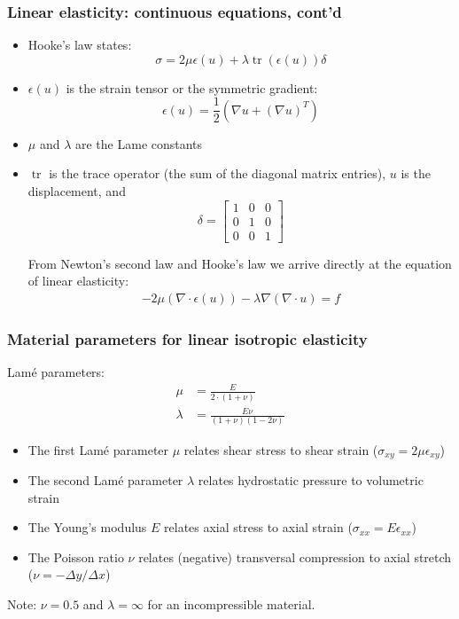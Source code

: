 \begin{frame}
\frametitle{Linear elasticity: continuous equations, cont'd}
\begin{itemize}
\item Hooke's law states:
\[
\sigma = 2 \mu \epsilon(u) + \lambda \operatorname{tr}(\epsilon(u)) \delta
\]
\item $\epsilon(u)$ is the strain tensor or the symmetric gradient:
\[
\epsilon(u) = \frac{1}{2} (\nabla u + (\nabla u)^T)
\]
\item $\mu$ and $\lambda$ are the Lame constants
\item $\operatorname{tr}$ is the trace operator (the sum of the diagonal matrix
entries), $u$ is the displacement, and
\[
\delta = \left[ \begin{array}{ccc} 1 & 0 & 0 \\ 0 & 1 & 0 \\ 0 & 0 & 1 \end{array} \right]
\]

From Newton's second law and Hooke's law we arrive directly at the equation of linear elasticity:
\begin{align}
\label{el:eq}
-2 \mu (\nabla \cdot \epsilon (u)) - \lambda \nabla (\nabla \cdot u) = f
\end{align}
\end{itemize}
\end{frame}

\begin{frame}
\frametitle{Material parameters for linear isotropic elasticity}

Lam\'e parameters:
\begin{align}
\mu &= \frac{E}{2\cdot(1 + \nu)} \\
\lambda &= \frac{E\nu}{(1 + \nu)(1 - 2\nu)}
\end{align}

\begin{itemize}
\item
  The first Lam\'e parameter $\mu$ relates shear stress to shear strain ($\sigma_{xy} = 2\mu\epsilon_{xy}$)
\item
  The second Lam\'e parameter $\lambda$ relates hydrostatic pressure to volumetric strain
\item
  The Young's modulus $E$ relates axial stress to axial strain ($\sigma_{xx} = E\epsilon_{xx}$)
\item
  The Poisson ratio $\nu$ relates (negative) transversal compression to axial stretch ($\nu = -\Delta y / \Delta x$)
\end{itemize}

Note: $\nu = 0.5$ and $\lambda = \infty$ for an incompressible material.

\end{frame}
